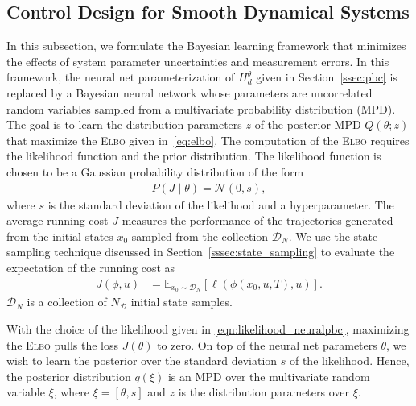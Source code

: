 \subsection{Control Design for Smooth Dynamical Systems}
In this subsection, we formulate the Bayesian learning framework that minimizes
the effects of system parameter uncertainties and measurement errors. 
%
In this framework, the neural net parameterization of $H^\theta_d$ given in
Section~\ref{ssec:pbc} is replaced by a Bayesian neural
network whose parameters are uncorrelated random variables sampled from a
multivariate probability distribution (MPD).
%
The goal is to learn the distribution parameters $z$ of the posterior MPD
$Q(\theta;z)$ that maximize the \textsc{Elbo} given in~\eqref{eq:elbo}. 
%
%
The computation of the \textsc{Elbo} requires the likelihood function and the
prior distribution.
%
The likelihood function is chosen to be a Gaussian probability
distribution of the form
\begin{align}
    P(J \mid \theta) = \mathcal{N}\left(0, s \right), 
    \label{eqn:likelihood_neuralpbc}
\end{align}
where $s$ is the standard deviation of the likelihood and a hyperparameter. 
%
The average running cost $J$ measures the performance of the trajectories
generated from the initial states $x_0$ sampled from the collection
$\mathcal{D}_N$.
%
We use the state sampling technique discussed in
Section~\ref{sssec:state_sampling} to evaluate the expectation of the running
cost as 
\begin{align*}
    J(\phi, u) &= \mathbb{E}_{x_0 \sim \mathcal{D}_N}[ \ell(\phi(x_0, u, T), u)].
\end{align*}
$\mathcal{D}_N$ is a collection of $N_{\mathcal{D}}$ initial state samples.
 
%
With the choice of the likelihood given in \eqref{eqn:likelihood_neuralpbc},
maximizing the \textsc{Elbo} pulls the loss $J(\theta)$ to zero.
%
On top of the neural net parameters $\theta$, we wish to learn the posterior
over the standard deviation $s$ of the likelihood. 
%
Hence, the posterior distribution $q(\xi)$ is an MPD over the multivariate
random variable $\xi$, where $\xi = [\theta, s]$ and $z$ is the distribution
parameters over $\xi$.
%


